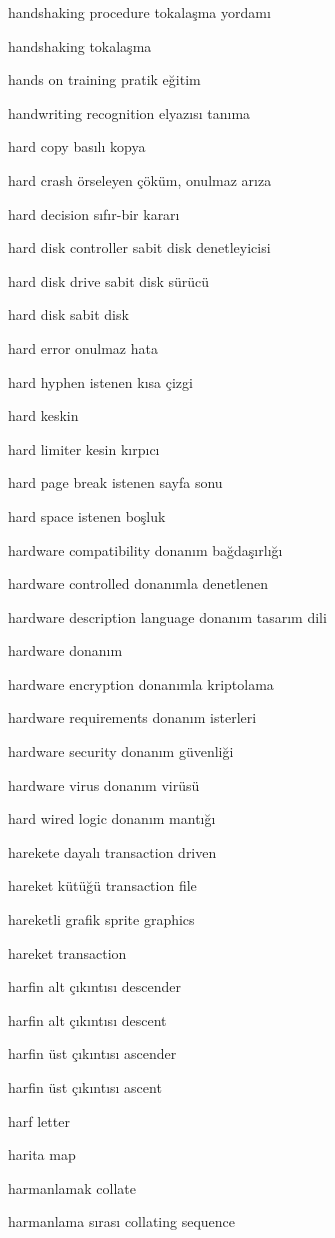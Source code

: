 \documentclass[12pt,fleqn]{article}\usepackage{../../common}
\begin{document}
handshaking procedure tokalaşma yordamı

handshaking tokalaşma

hands on training pratik eğitim

handwriting recognition elyazısı tanıma

hard copy basılı kopya

hard crash örseleyen çöküm, onulmaz arıza

hard decision sıfır-bir kararı

hard disk controller sabit disk denetleyicisi

hard disk drive sabit disk sürücü

hard disk sabit disk

hard error onulmaz hata

hard hyphen istenen kısa çizgi

hard keskin

hard limiter kesin kırpıcı

hard page break istenen sayfa sonu

hard space istenen boşluk

hardware compatibility donanım bağdaşırlığı

hardware controlled donanımla denetlenen

hardware description language donanım tasarım dili

hardware donanım

hardware encryption donanımla kriptolama

hardware requirements donanım isterleri

hardware security donanım güvenliği

hardware virus donanım virüsü

hard wired logic donanım mantığı

harekete dayalı transaction driven

hareket kütüğü transaction file

hareketli grafik sprite graphics

hareket transaction

harfin alt çıkıntısı descender

harfin alt çıkıntısı descent

harfin üst çıkıntısı ascender

harfin üst çıkıntısı ascent

harf letter

harita map

harmanlamak collate

harmanlama sırası collating sequence
\end{document}
